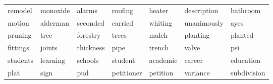 \begin{table}[ht]
\begin{tabular}{lllllll}
  \cellcolor{red!10}remodel & \cellcolor{red!10}monoxide & \cellcolor{red!10}alarms & \cellcolor{red!10}roofing & \cellcolor{red!10}heater & \cellcolor{red!10}description & \cellcolor{red!10}bathroom \\ 
  \cellcolor{red!10}motion & \cellcolor{red!10}alderman & \cellcolor{red!10}seconded & \cellcolor{red!10}carried & \cellcolor{red!10}whiting & \cellcolor{red!10}unanimously & \cellcolor{red!10}ayes \\ 
  \cellcolor{white}pruning & \cellcolor{white}tree & \cellcolor{white}forestry & \cellcolor{white}trees & \cellcolor{white}mulch & \cellcolor{white}planting & \cellcolor{white}planted \\ 
  \cellcolor{red!10}fittings & \cellcolor{red!10}joints & \cellcolor{red!10}thickness & \cellcolor{red!10}pipe & \cellcolor{red!10}trench & \cellcolor{red!10}valve & \cellcolor{red!10}psi \\ 
  \cellcolor{white}students & \cellcolor{white}learning & \cellcolor{white}schools & \cellcolor{white}student & \cellcolor{white}academic & \cellcolor{white}career & \cellcolor{white}education \\ 
  \cellcolor{red!20}plat & \cellcolor{red!20}sign & \cellcolor{red!20}pud & \cellcolor{red!20}petitioner & \cellcolor{red!20}petition & \cellcolor{red!20}variance & \cellcolor{red!20}subdivision \\ 
   \hline
\end{tabular}
\endgroup
\end{table}

